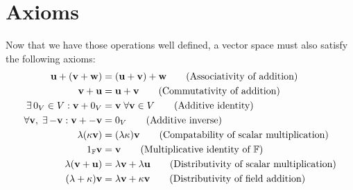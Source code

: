 \section{Axioms}
Now that we have those operations well defined, a vector space must also satisfy the following axioms:
\begin{align}
    \vec{u} + (\vec{v} + \vec{w}) &= (\vec{u} + \vec{v}) + \vec{w} \tag{Associativity of addition} \\
    \vec{v} + \vec{u} &= \vec{u} + \vec{v} \tag{Commutativity of addition} \\
    \exists\, 0_V \in V: \vec{v} + 0_V &= \vec{v}\;\forall \vec{v} \in V \tag{Additive identity} \\
    \forall \vec{v},\; \exists\, {-\vec{v}}: \vec{v} + -\vec{v} &= 0_V \tag{Additive inverse} \\
    \lambda(\kappa\vec{v}) &= (\lambda\kappa)\vec{v} \tag{Compatability of scalar multiplication} \\
    1_{\mathbb{F}}\vec{v} &= \vec{v} \tag{Multiplicative identity of $\mathbb{F}$} \\
    \lambda(\vec{v} +\vec{u}) &= \lambda\vec{v} + \lambda\vec{u} \tag{Distributivity of scalar multiplication} \\
    (\lambda + \kappa)\vec{v} &= \lambda\vec{v} + \kappa\vec{v} \tag{Distributivity of field addition}
\end{align}

